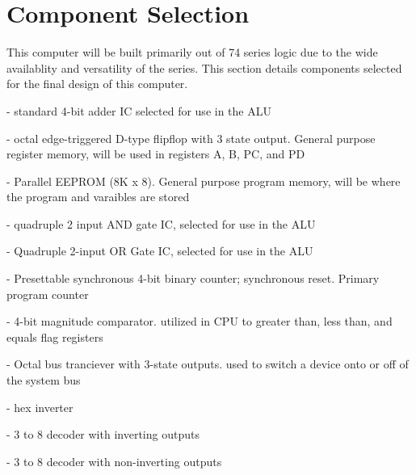 \documentclass[11pt]{article} %
\begin{document}
\section{Component Selection}
This computer will be built primarily out of 74 series logic due to the wide availablity and versatility of the series. 
This section details components selected for the final design of this computer.
\begin{description}[font=$\bullet$~\normalfont\scshape\color{red!50!black}]
\vspace{-5mm}
\item[CD74HCT283] - standard 4-bit adder IC selected for use in the ALU \\\vspace{-5mm}
\item[SN74HCT574] - octal edge-triggered D-type flipflop with 3 state output. General purpose register memory, will be used in registers A, B, PC, and PD \\\vspace{-5mm}
\item[AT28C64B] - Parallel EEPROM (8K x 8). General purpose program memory, will be where the program and varaibles are stored \\\vspace{-5mm}
\item[SN74HCT08] - quadruple 2 input AND gate IC, selected for use in the ALU \\\vspace{-5mm}
\item[SN74HCT32] - Quadruple 2-input OR Gate IC, selected for use in the ALU \\\vspace{-5mm}
\item[74HCT163] - Presettable synchronous 4-bit binary counter; synchronous reset. Primary program counter \\\vspace{-5mm}
\item[74HCT85] - 4-bit magnitude comparator. utilized in CPU to greater than, less than, and equals flag registers \\\vspace{-5mm}
\item[74HCT245] - Octal bus tranciever with 3-state outputs. used to switch a device onto or off of the system bus \\\vspace{-5mm}
\item[74HCT04] - hex inverter \\\vspace{-5mm}
\item[74HCT138] - 3 to 8 decoder with inverting outputs \\\vspace{-5mm}
\item[74HCT238] - 3 to 8 decoder with non-inverting outputs \\\vspace{-5mm}
\end{description}
\end{document}
